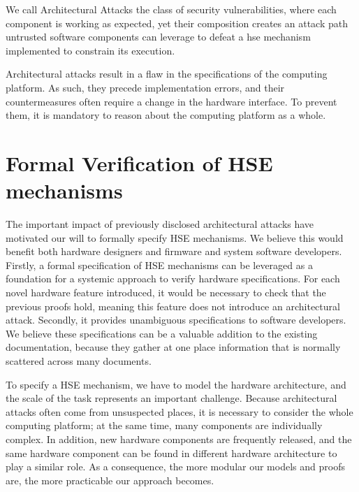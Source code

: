 \begin{definition}
  We call Architectural Attacks the class of security vulnerabilities, where
  each component is working as expected, yet their composition creates an attack
  path untrusted software components can leverage to defeat a \ac{hse} mechanism
  implemented to constrain its execution.
\end{definition}

Architectural attacks result in a flaw in the specifications of the computing
platform.
%
As such, they precede implementation errors, and their countermeasures often
require a change in the hardware interface.
%
To prevent them, it is mandatory to reason about the computing platform as a
whole.

\section{Formal Verification of HSE mechanisms}
\label{sec:intro:verif}

The important impact of previously disclosed architectural attacks have
motivated our will to formally specify HSE mechanisms.
%
We believe this would benefit both hardware designers and firmware and system
software developers.
%
Firstly, a formal specification of HSE mechanisms can be leveraged as a
foundation for a systemic approach to verify hardware specifications.
%
For each novel hardware feature introduced, it would be necessary to check that
the previous proofs hold, meaning this feature does not introduce an
architectural attack.
%
Secondly, it provides unambiguous specifications to software developers.
%
We believe these specifications can be a valuable addition to the existing
documentation, because they gather at one place information that is normally
scattered across many documents.

To specify a HSE mechanism, we have to model the hardware architecture, and the
scale of the task represents an important challenge.
%
Because architectural attacks often come from unsuspected places, it is
necessary to consider the whole computing platform; at the same time, many
components are individually complex.
%
In addition, new hardware components are frequently released, and the same
hardware component can be found in different hardware architecture to play a
similar role.
%
As a consequence, the more modular our models and proofs are, the more
practicable our approach becomes.

